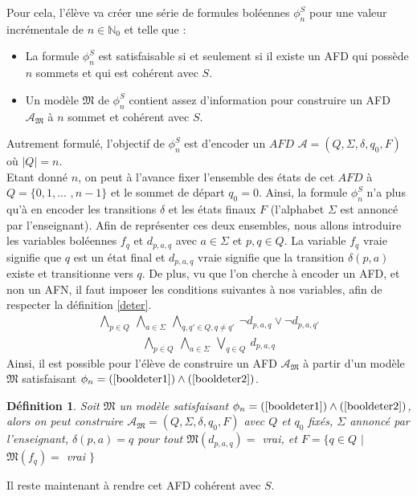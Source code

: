 \documentclass[12pt,a4paper,oneside,titlepage]{report}
\newtheorem{defi}{D\'efinition}[section]
\begin{document}
\noindent Pour cela, l'élève va créer une série de formules boléennes $\phi^S_n$ pour une valeur incrémentale de $n\in\mathbb{N}_0$ et telle que :
\begin{itemize}
\item La formule $\phi^S_n$ est satisfaisable si et seulement si il existe un AFD qui possède $n$ sommets et qui est cohérent avec $S$.
\item Un modèle $\mathfrak{M}$ de $\phi^S_n$ contient assez d'information pour construire un AFD $\mathcal{A}_\mathfrak{M}$ à $n$ sommet et cohérent avec $S$.
\end{itemize}

\noindent Autrement formulé, l'objectif de $\phi^S_n$ est d'encoder un $AFD$ $\mathcal{A}=(Q,\Sigma,\delta,q_0,F)$ où $|Q|=n$.\\

\noindent Etant donné $n$, on peut à l'avance fixer l'ensemble des états de cet $AFD$  à $Q=\{0,1,...$ $,n-1\}$ et le sommet de départ $q_0=0$. Ainsi, la formule $\phi^S_n$ n'a plus qu'à en encoder les transitions $\delta$ et les états finaux $F$ (l'alphabet $\Sigma$ est annoncé par l'enseignant). Afin de représenter ces deux ensembles, nous allons introduire les variables boléennes $f_q$ et $d_{p,a,q}$ avec $a\in\Sigma$ et $p,q\in Q$. La variable $f_q$ vraie signifie que $q$ est un état final et $d_{p,a,q}$ vraie signifie que la transition $\delta(p,a)$ existe et transitionne vers $q$. De plus, vu que l'on cherche à encoder un AFD, et non un AFN, il faut imposer les conditions suivantes à nos variables, afin de respecter la définition \ref{deter}.
\begin{equation}
\label{booldeter1}
\begin{aligned} \bigwedge _{p \in Q}~ \bigwedge _{a \in \varSigma }~ \bigwedge _{q, q' \in Q, q \ne q'}~ \lnot d_{p, a, q} \vee \lnot d_{p, a, q'} \end{aligned}
\end{equation}
\begin{equation}
\label{booldeter2}
\begin{aligned} \bigwedge _{p \in Q}~ \bigwedge _{a \in \varSigma }~ \bigvee _{q \in Q}~ d_{p, a, q} \end{aligned}
\end{equation}
Ainsi, il est possible pour l'élève de construire un AFD $\mathcal{A}_\mathfrak{M}$ à partir d'un modèle $\mathfrak{M}$ satisfaisant $\phi_n=(\ref{booldeter1})\land(\ref{booldeter2})$.
\begin{defi}
Soit $\mathfrak{M}$ un modèle satisfaisant $\phi_n=(\ref{booldeter1})\land(\ref{booldeter2})$, alors on peut construire $\mathcal{A}_\mathfrak{M}=(Q,\Sigma,\delta,q_0,F)$ avec $Q$ et $q_0$ fixés, $\Sigma$ annoncé par l'enseignant, $\delta(p,a)=q$ pour tout $\mathfrak{M}(d_{p,a,q})=$ vrai, et $F=\{q\in Q$ $|$ $\mathfrak{M}(f_q)=$ vrai $\}$
\end{defi}
\noindent Il reste maintenant à rendre cet AFD cohérent avec $S$.
\end{document}

